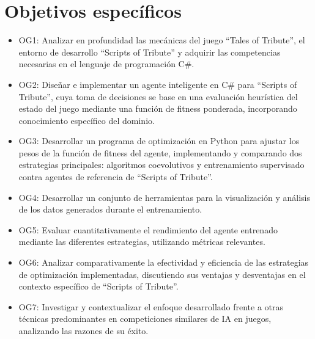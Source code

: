 \section{Objetivos específicos} \label{sec:objetivos_especificos}

\begin{itemize}
	\item OG1: Analizar en profundidad las mecánicas del juego ``Tales of Tribute'', el entorno de desarrollo ``Scripts of Tribute'' y adquirir las competencias necesarias en el lenguaje de programación C\#.
	\item OG2: Diseñar e implementar un agente inteligente en C\# para ``Scripts of Tribute'', cuya toma de decisiones se base en una evaluación heurística del estado del juego mediante una función de fitness ponderada, incorporando conocimiento específico del dominio.
	\item OG3: Desarrollar un programa de optimización en Python para ajustar los pesos de la función de fitness del agente, implementando y comparando dos estrategias principales: algoritmos coevolutivos y entrenamiento supervisado contra agentes de referencia de ``Scripts of Tribute''.
	\item OG4: Desarrollar un conjunto de herramientas para la visualización y análisis de los datos generados durante el entrenamiento.
	\item OG5: Evaluar cuantitativamente el rendimiento del agente entrenado mediante las diferentes estrategias, utilizando métricas relevantes.
	\item OG6: Analizar comparativamente la efectividad y eficiencia de las estrategias de optimización implementadas, discutiendo sus ventajas y desventajas en el contexto específico de ``Scripts of Tribute''.
	\item OG7: Investigar y contextualizar el enfoque desarrollado frente a otras técnicas predominantes en competiciones similares de IA en juegos, analizando las razones de su éxito.
\end{itemize}